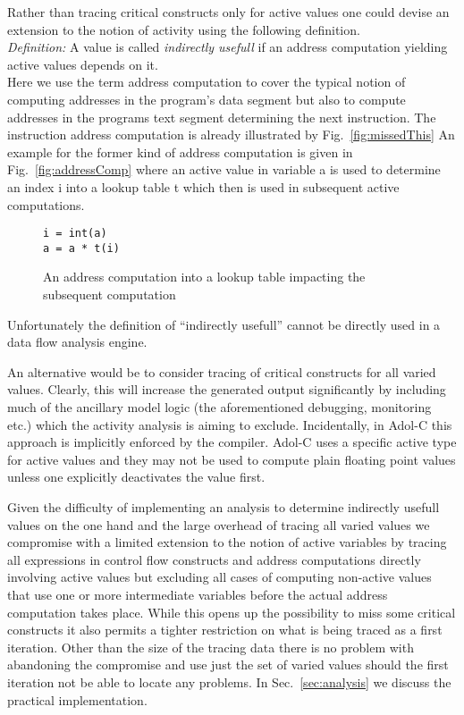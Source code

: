 \documentclass{article}
\newcommand{\refsec}[1]{{Sec.~\ref{#1}}}
\newcommand{\reffig}[1]{{Fig.~\ref{#1}}}
\begin{document}
Rather than tracing critical constructs only for  active values 
one could devise an extension to the notion of activity using the following 
definition.\\
{\em Definition: } A value is called {\em indirectly usefull} 
if an address computation yielding active values depends on it.\\
Here we use the term  address computation to cover the typical notion of 
computing addresses in the program's data segment but also to compute 
addresses in the programs text segment determining the next instruction. 
The instruction address computation is already illustrated by \reffig{fig:missedThis}
An example for the former kind of address computation is given in 
\reffig{fig:addressComp} where an active value in variable a is used to 
determine an index i into a lookup table t which then is used in 
subsequent active computations.
\begin{figure}
\begin{lstlisting}
i = int(a) 
a = a * t(i)
\end{lstlisting}
\caption{An address computation into a lookup table impacting the subsequent computation}\label{fig:subdomains} 
\end{figure}
Unfortunately the definition of ``indirectly usefull'' cannot be directly used in a 
data flow analysis engine. 

An alternative would be to consider tracing of critical constructs for all varied values. 
Clearly, this will increase the generated output significantly by including much 
of the ancillary model logic (the aforementioned debugging, monitoring etc.) which 
the activity analysis is aiming to exclude. 
Incidentally, in Adol-C this approach is implicitly enforced by the compiler. 
Adol-C uses a specific  
active type for active values and they may not be used to 
compute plain floating point values unless one 
explicitly deactivates the value first. 

Given the difficulty of implementing an analysis to determine indirectly usefull values 
on the one hand and the large overhead of tracing all varied values we 
compromise with a limited extension to the notion of active variables by tracing  
all expressions in control flow constructs and address computations directly involving active values
but excluding all cases of computing non-active values that use one or more intermediate 
variables before the actual address computation takes place. 
While this opens up the possibility to miss some critical constructs 
it also permits a tighter restriction on what is being traced as a first iteration. 
Other than the size of the tracing data  there is no problem with abandoning the compromise
and use just the set of varied values should the first iteration not be able to 
locate any problems.    
In \refsec{sec:analysis} we discuss the practical implementation.
\end{document}
